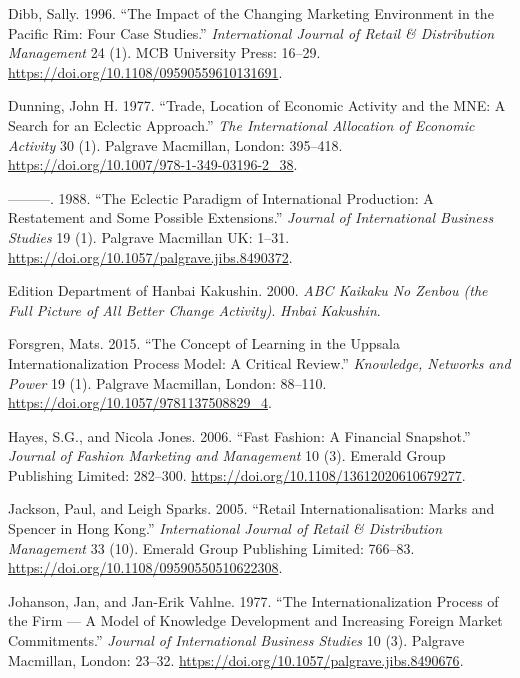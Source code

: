 \documentclass[12pt,a4paper]{article}
\begin{document}
\leavevmode\hypertarget{ref-innovative8}{}%
Dibb, Sally. 1996. ``The Impact of the Changing Marketing Environment in
the Pacific Rim: Four Case Studies.'' \emph{International Journal of
Retail \& Distribution Management} 24 (1). MCB University Press: 16--29.
\url{https://doi.org/10.1108/09590559610131691}.

\leavevmode\hypertarget{ref-innovative9}{}%
Dunning, John H. 1977. ``Trade, Location of Economic Activity and the
MNE: A Search for an Eclectic Approach.'' \emph{The International
Allocation of Economic Activity} 30 (1). Palgrave Macmillan, London:
395--418. \url{https://doi.org/10.1007/978-1-349-03196-2_38}.

\leavevmode\hypertarget{ref-innovative10}{}%
---------. 1988. ``The Eclectic Paradigm of International Production: A
Restatement and Some Possible Extensions.'' \emph{Journal of
International Business Studies} 19 (1). Palgrave Macmillan UK: 1--31.
\url{https://doi.org/10.1057/palgrave.jibs.8490372}.

\leavevmode\hypertarget{ref-innovative3}{}%
Edition Department of Hanbai Kakushin. 2000. \emph{ABC Kaikaku No Zenbou
(the Full Picture of All Better Change Activity)}. \emph{Hnbai
Kakushin}.

\leavevmode\hypertarget{ref-innovative11}{}%
Forsgren, Mats. 2015. ``The Concept of Learning in the Uppsala
Internationalization Process Model: A Critical Review.''
\emph{Knowledge, Networks and Power} 19 (1). Palgrave Macmillan, London:
88--110. \url{https://doi.org/10.1057/9781137508829_4}.

\leavevmode\hypertarget{ref-innovative12}{}%
Hayes, S.G., and Nicola Jones. 2006. ``Fast Fashion: A Financial
Snapshot.'' \emph{Journal of Fashion Marketing and Management} 10 (3).
Emerald Group Publishing Limited: 282--300.
\url{https://doi.org/10.1108/13612020610679277}.

\leavevmode\hypertarget{ref-innovative13}{}%
Jackson, Paul, and Leigh Sparks. 2005. ``Retail Internationalisation:
Marks and Spencer in Hong Kong.'' \emph{International Journal of Retail
\& Distribution Management} 33 (10). Emerald Group Publishing Limited:
766--83. \url{https://doi.org/10.1108/09590550510622308}.

\leavevmode\hypertarget{ref-innovative14}{}%
Johanson, Jan, and Jan-Erik Vahlne. 1977. ``The Internationalization
Process of the Firm --- A Model of Knowledge Development and Increasing
Foreign Market Commitments.'' \emph{Journal of International Business
Studies} 10 (3). Palgrave Macmillan, London: 23--32.
\url{https://doi.org/10.1057/palgrave.jibs.8490676}.
\end{document}
